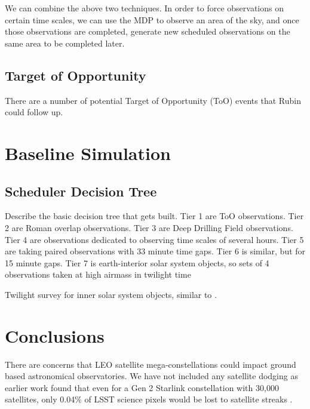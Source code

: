 \documentclass[]{aastex631}
\begin{document}
We can combine the above two techniques. In order to force observations on certain time scales, we can use the MDP to observe an area of the sky, and once those observations are completed, generate new scheduled observations on the same area to be completed later. 

\subsection{Target of Opportunity}

There are a number of potential Target of Opportunity (ToO) events that Rubin could follow up. 


\section{Baseline Simulation}


\subsection{Scheduler Decision Tree}
Describe the basic decision tree that gets built. Tier 1 are ToO observations. Tier 2 are Roman overlap observations. Tier 3 are Deep Drilling Field observations. Tier 4 are observations dedicated to observing time scales of several hours. Tier 5 are taking paired observations with 33 minute time gaps. Tier 6 is similar, but for 15 minute gaps. Tier 7 is earth-interior solar system objects, so sets of 4 observations taken at high airmass in twilight time 






Twilight survey for inner solar system objects, similar to \citet{Ye2020}.





\section{Conclusions}

There are concerns that LEO satellite mega-constellations could impact ground based astronomical observatories. We have not included any satellite dodging as earlier work found that even for a Gen 2 Starlink constellation with 30,000 satellites, only 0.04\% of LSST science pixels would be lost to satellite streaks \citep{Hu2022, Yoachim2025}.

          
\end{document}
